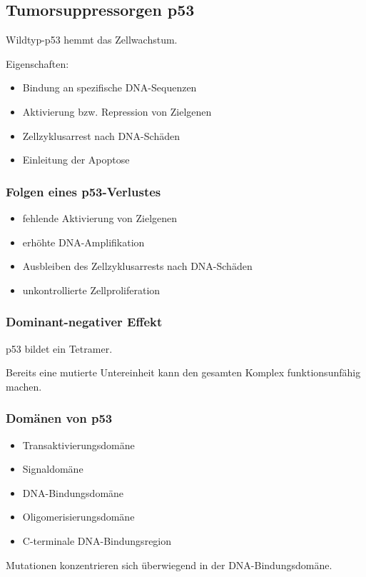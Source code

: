\begin{bsp}
    \subsection*{Tumorsuppressorgen p53}\label{subsec:tumorsuppressorgen-p53}
    Wildtyp-p53 hemmt das Zellwachstum.

    Eigenschaften:

    \begin{itemize}
        \item Bindung an spezifische DNA-Sequenzen
        \item Aktivierung bzw.
        Repression von Zielgenen
        \item Zellzyklusarrest nach DNA-Schäden
        \item Einleitung der Apoptose
    \end{itemize}

    \subsubsection*{Folgen eines p53-Verlustes}

    \begin{itemize}
        \item fehlende Aktivierung von Zielgenen
        \item erhöhte DNA-Amplifikation
        \item Ausbleiben des Zellzyklusarrests nach DNA-Schäden
        \item unkontrollierte Zellproliferation
    \end{itemize}

    \subsubsection*{Dominant-negativer Effekt}

    p53 bildet ein Tetramer.

    Bereits eine mutierte Untereinheit kann den gesamten Komplex funktionsunfähig machen.

    \subsubsection*{Domänen von p53}

    \begin{itemize}
        \item Transaktivierungsdomäne
        \item Signaldomäne
        \item DNA-Bindungsdomäne
        \item Oligomerisierungsdomäne
        \item C-terminale DNA-Bindungsregion
    \end{itemize}

    Mutationen konzentrieren sich überwiegend in der DNA-Bindungsdomäne.
\end{bsp}

